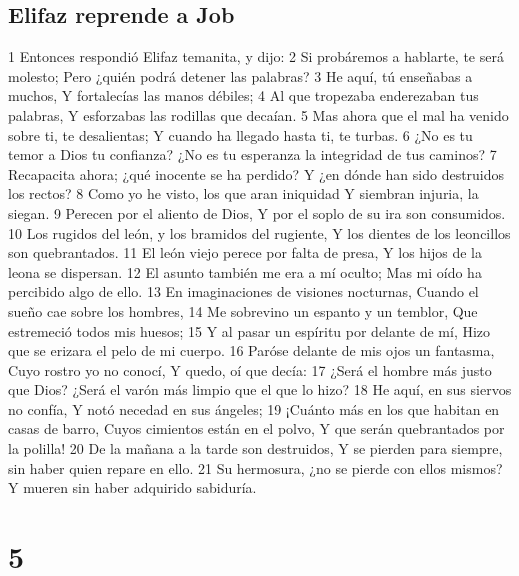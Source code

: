 \section*{Elifaz reprende a Job}

1 Entonces respondió Elifaz temanita, y dijo:
2 Si probáremos a hablarte, te será molesto;
Pero ¿quién podrá detener las palabras?
3 He aquí, tú enseñabas a muchos,
Y fortalecías las manos débiles;
4 Al que tropezaba enderezaban tus palabras,
Y esforzabas las rodillas que decaían. 
5 Mas ahora que el mal ha venido sobre ti, te desalientas;
Y cuando ha llegado hasta ti, te turbas.
6 ¿No es tu temor a Dios tu confianza?
¿No es tu esperanza la integridad de tus caminos? 
7 Recapacita ahora; ¿qué inocente se ha perdido?
Y ¿en dónde han sido destruidos los rectos?
8 Como yo he visto, los que aran iniquidad
Y siembran injuria, la siegan.
9 Perecen por el aliento de Dios,
Y por el soplo de su ira son consumidos.
10 Los rugidos del león, y los bramidos del rugiente,
Y los dientes de los leoncillos son quebrantados. 
11 El león viejo perece por falta de presa,
Y los hijos de la leona se dispersan.
12 El asunto también me era a mí oculto;
Mas mi oído ha percibido algo de ello.
13 En imaginaciones de visiones nocturnas,
Cuando el sueño cae sobre los hombres,
14 Me sobrevino un espanto y un temblor,
Que estremeció todos mis huesos;
15 Y al pasar un espíritu por delante de mí,
Hizo que se erizara el pelo de mi cuerpo.
16 Paróse delante de mis ojos un fantasma,
Cuyo rostro yo no conocí,
Y quedo, oí que decía:
17 ¿Será el hombre más justo que Dios?
¿Será el varón más limpio que el que lo hizo?
18 He aquí, en sus siervos no confía,
Y notó necedad en sus ángeles;
19 ¡Cuánto más en los que habitan en casas de barro,
Cuyos cimientos están en el polvo,
Y que serán quebrantados por la polilla!
20 De la mañana a la tarde son destruidos,
Y se pierden para siempre, sin haber quien repare en ello. 
21 Su hermosura, ¿no se pierde con ellos mismos?
Y mueren sin haber adquirido sabiduría.

\chapter{5}

